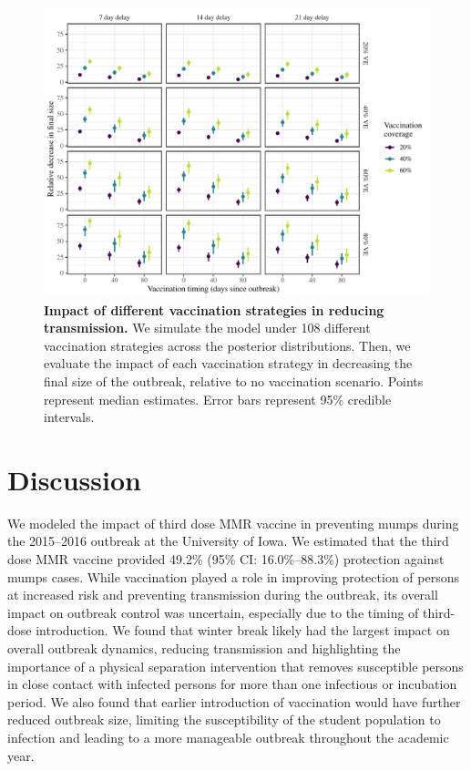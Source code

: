 \documentclass[12pt]{article}
\begin{document}
\begin{figure}[!h]
\includegraphics[width=\textwidth]{../figure_stanfit_seirv_final/figure_stanfit_strategy.pdf}
\caption{
\textbf{Impact of different vaccination strategies in reducing transmission.}
We simulate the model under 108 different vaccination strategies across the posterior distributions.
Then, we evaluate the impact of each vaccination strategy in decreasing the final size of the outbreak, relative to no vaccination scenario.
Points represent median estimates.
Error bars represent 95\% credible intervals.
}
\label{fig:strat}
\end{figure}

\section{Discussion}

We modeled the impact of third dose MMR vaccine in preventing mumps during the 2015--2016 outbreak at the University of Iowa. 
We estimated that the third dose MMR vaccine provided 49.2\% (95\% CI: 16.0\%–88.3\%) protection against mumps cases. 
While vaccination played a role in improving protection of persons at increased risk and preventing transmission during the outbreak, its overall impact on outbreak control was uncertain, especially due to the timing of third-dose introduction. 
We found that winter break likely had the largest impact on overall outbreak dynamics, reducing transmission and highlighting the importance of a physical separation intervention that removes susceptible persons in close contact with infected persons for more than one infectious or incubation period. 
We also found that earlier introduction of vaccination would have further reduced outbreak size, limiting the susceptibility of the student population to infection and leading to a more manageable outbreak throughout the academic year. 
\end{document}
